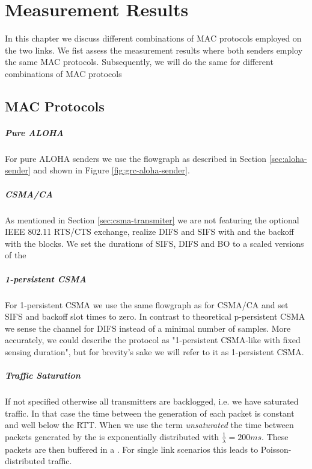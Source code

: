 \chapter{Measurement Results}
\label{ch:results}

In this chapter we discuss different combinations of MAC protocols employed on the two links.  We fist assess the measurement results where both senders employ the same MAC protocols. Subsequently, we will do the same for different combinations of MAC protocols 

\section{MAC Protocols}

\paragraph{Pure ALOHA}
For pure ALOHA senders we use the flowgraph as described in Section \ref{sec:aloha-sender} and shown in Figure \ref{fig:grc-aloha-sender}. 

\paragraph{CSMA/CA}
As mentioned in Section \ref{sec:csma-transmiter} we are not featuring the optional IEEE 802.11 RTS/CTS exchange, realize DIFS and SIFS with  and the backoff with the  blocks. We set the durations of SIFS, DIFS and BO to a scaled versions of the 

\paragraph{1-persistent CSMA}
For 1-persistent CSMA we use the same flowgraph as for CSMA/CA and set SIFS and backoff slot times to zero. In contrast to theoretical p-persistent CSMA we sense the channel for DIFS instead of a minimal number of samples. More accurately, we could describe the protocol as "1-persistent CSMA-like with fixed sensing duration", but for brevity's sake we will refer to it as 1-persistent CSMA.  
 
\paragraph{Traffic Saturation}
If not specified otherwise all transmitters are backlogged, i.e. we have saturated traffic. In that case the time between the generation of each packet is constant and well below the RTT. When we use the term \emph{unsaturated} the time between packets generated by the  is exponentially distributed with $\frac{1}{\lambda}=200ms$. These packets are then buffered in a . For single link scenarios this leads to Poisson-distributed traffic. 

